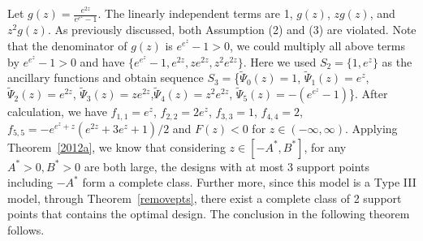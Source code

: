 \documentclass[11pt]{amsart}
\theoremstyle{definition}
\theoremstyle{remark}
\numberwithin{equation}{section}
\begin{document}
Let $g(z) =  \frac{e^{2z}}{e^{e^z}-1}$. The linearly independent terms are 1, $g(z)$, $zg(z)$, and $z^2g(z)$. As previously discussed, both Assumption (2) and (3) are violated. Note that the denominator of $g(z)$ is $e^{e^z}-1>0$, we could multiply all above terms by $e^{e^z}-1>0$ and have $\{e^{e^z}-1,e^{2z}, ze^{2z}, z^2e^{2z}\}$. Here we used $S_2 = \{1,e^z\}$ as the ancillary functions and obtain sequence $S_3 = $\{$\tilde{\Psi}_0(z) = 1$, $\tilde{\Psi}_1(z) = e^z$,$\tilde{\Psi}_2(z) = e^{2z}$,  $\tilde{\Psi}_3(z) = ze^{2z}$,$\tilde{\Psi}_4(z) = z^2e^{2z}$, $\tilde{\Psi}_5(z) = -(e^{e^z}-1)$\}. 
After calculation, we have $f_{1,1} = e^z$, $f_{2,2} =2e^z$, $f_{3,3} = 1$, $f_{4,4} = 2$, $f_{5,5} =- e^{e^z+z}(e^{2z}+3e^z+1)/2$ and $F(z)<0$ for $z\in(-\infty,\infty)$. Applying Theorem~\ref{2012a}, we know that considering $z\in[-A^*,B^*]$, for any $A^*>0, B^*>0$ are both large, the designs with at most 3 support points including $-A^*$ form a complete class. Further more, since this model is a Type III model, through Theorem~\ref{removepts}, there exist a complete class of 2 support points that contains the optimal design. The conclusion in the following theorem follows.
\end{document}
